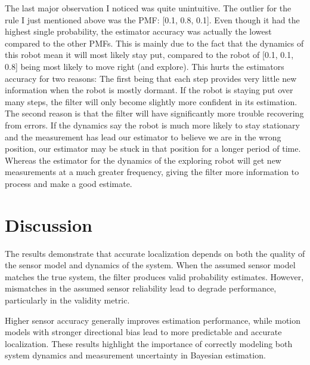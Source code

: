 \documentclass[11pt, letterpaper, twocolumn]{article}
\begin{document}
The last major observation I noticed was quite unintuitive. The outlier for the 
rule I just mentioned above was the PMF: [0.1, 0.8, 0.1]. Even though it had the highest
single probability, the estimator accuracy was actually the lowest compared to the
other PMFs. This is mainly due to the fact that the dynamics of this robot mean
it will most likely stay put, compared to the robot of [0.1, 0.1, 0.8] being most
likely to move right (and explore). This hurts the estimators accuracy for two reasons:
The first being that each step provides very little new information when the robot is
mostly dormant. If the robot is staying put over many steps, the filter will only 
become slightly more confident in its estimation. The second reason is that the filter
will have significantly more trouble recovering from errors. If the dynamics say the robot
is much more likely to stay stationary and the measurement has lead our estimator to 
believe we are in the wrong position, our estimator may be stuck in that position
for a longer period of time. Whereas the estimator for the dynamics of the exploring
robot will get new measurements at a much greater frequency, giving the filter 
more information to process and make a good estimate.

\section*{Discussion}

The results demonstrate that accurate localization depends on both the quality of 
the sensor model and dynamics of the system. When the assumed sensor model matches
the true system, the filter produces valid probability estimates. However, mismatches
in the assumed sensor reliability lead to degrade performance, particularly in 
the validity metric.

Higher sensor accuracy generally improves estimation performance, while motion
models with stronger directional bias lead to more predictable and accurate
localization. These results highlight the importance of correctly modeling 
both system dynamics and measurement uncertainty in Bayesian estimation.
\end{document}
